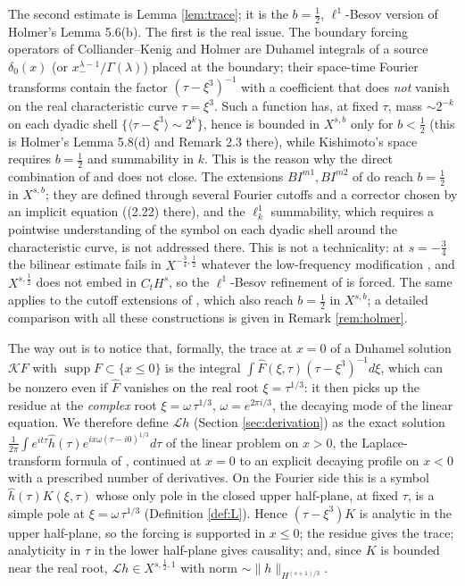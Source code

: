 \documentclass[10pt,reqno]{amsart}
\theoremstyle{remark}
\numberwithin{equation}{section}
\newcommand{\om}{\omega}
\newcommand{\la}{\lambda}
\newcommand{\supp}{\operatorname{supp}}
\newcommand{\lan}{\langle}
\newcommand{\ran}{\rangle}
\newcommand{\Lc}{\mathcal{L}}
\newcommand{\Kc}{\mathcal{K}}
\begin{document}
The second estimate is Lemma \ref{lem:trace}; it is the $b=\frac12$, $\ell^1$-Besov version of Holmer's Lemma 5.6(b). The first is the real issue. The boundary forcing operators of Colliander--Kenig \cite{CK} and Holmer \cite{Holmer} are Duhamel integrals of a source $\delta_0(x)$ (or $x_-^{\la-1}/\Gamma(\la)$) placed at the boundary; their space-time Fourier transforms contain the factor $(\tau-\xi^3)^{-1}$ with a coefficient that does \emph{not} vanish on the real characteristic curve $\tau=\xi^3$. Such a function has, at fixed $\tau$, mass $\sim 2^{-k}$ on each dyadic shell $\{\lan\tau-\xi^3\ran\sim 2^k\}$, hence is bounded in $X^{s,b}$ only for $b<\frac12$ (this is Holmer's Lemma 5.8(d) and Remark 2.3 there), while Kishimoto's space requires $b=\frac12$ and summability in $k$. This is the reason why the direct combination of \cite{Holmer} and \cite{Kishimoto} does not close. The extensions $BI^{m1},BI^{m2}$ of \cite{BSZ2} do reach $b=\frac12$ in $X^{s,b}$; they are defined through several Fourier cutoffs and a corrector chosen by an implicit equation ((2.22) there), and the $\ell^1_k$ summability, which requires a pointwise understanding of the symbol on each dyadic shell around the characteristic curve, is not addressed there. This is not a technicality: at $s=-\frac34$ the bilinear estimate fails in $X^{-\frac34,\frac12}$ whatever the low-frequency modification \cite{NTT,Kishimoto2}, and $X^{s,\frac12}$ does not embed in $C_tH^s$, so the $\ell^1$-Besov refinement of \cite{Kishimoto} is forced. The same applies to the cutoff extensions of \cite{ET,HY,CT,GK}, which also reach $b=\frac12$ in $X^{s,b}$; a detailed comparison with all these constructions is given in Remark \ref{rem:holmer}.

The way out is to notice that, formally, the trace at $x=0$ of a Duhamel solution $\Kc F$ with $\supp F\subset\{x\le0\}$ is the integral $\int\widehat F(\xi,\tau)(\tau-\xi^3)^{-1}d\xi$, which can be nonzero even if $\widehat F$ vanishes on the real root $\xi=\tau^{1/3}$: it then picks up the residue at the \emph{complex} root $\xi=\om\,\tau^{1/3}$, $\om=e^{2\pi i/3}$, the decaying mode of the linear equation. We therefore define $\Lc h$ (Section \ref{sec:derivation}) as the exact solution $\frac1{2\pi}\int e^{it\tau}\widehat h(\tau)e^{ix\om(\tau-i0)^{1/3}}d\tau$ of the linear problem on $x>0$, the Laplace-transform formula of \cite{BSZ1}, continued at $x=0$ to an explicit decaying profile on $x<0$ with a prescribed number of derivatives. On the Fourier side this is a symbol $\widehat h(\tau)K(\xi,\tau)$ whose only pole in the closed upper half-plane, at fixed $\tau$, is a simple pole at $\xi=\om\,\tau^{1/3}$ (Definition \ref{def:L}). Hence $(\tau-\xi^3)K$ is analytic in the upper half-plane, so the forcing is supported in $x\le0$; the residue gives the trace; analyticity in $\tau$ in the lower half-plane gives causality; and, since $K$ is bounded near the real root, $\Lc h\in X^{s,\frac12,1}$ with norm $\sim\|h\|_{H^{(s+1)/3}}$.
\end{document}
